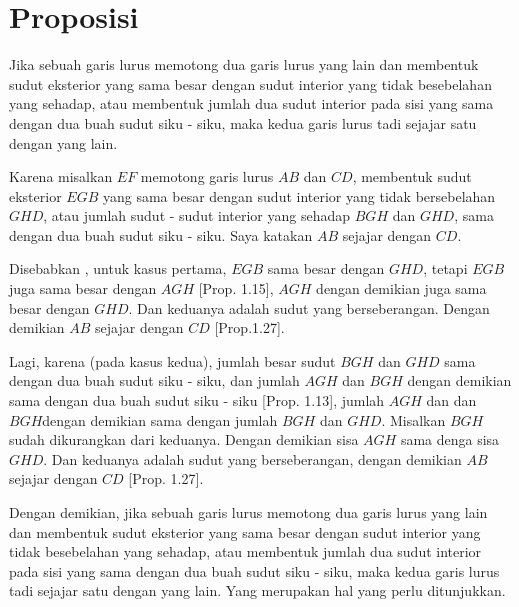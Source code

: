 \documentclass[a4paper]{book}
\begin{document}
\section*{\centering Proposisi \thesection}
Jika sebuah garis lurus memotong dua garis lurus yang lain dan membentuk
sudut eksterior yang sama besar dengan sudut interior yang tidak besebelahan
yang sehadap, atau membentuk jumlah dua sudut interior pada sisi 
yang sama dengan dua buah sudut siku - siku, maka kedua garis lurus
tadi sejajar satu dengan yang lain.
\begin{center}
\end{center} 
Karena misalkan $EF$ memotong garis lurus $AB$ dan $CD$, membentuk sudut 
eksterior $EGB$ yang sama besar dengan sudut interior yang tidak bersebelahan
$GHD$, atau jumlah sudut - sudut interior yang sehadap $BGH$ 
dan $GHD$, sama dengan dua buah sudut siku - siku. Saya katakan $AB$ sejajar 
dengan $CD$.

Disebabkan , untuk kasus pertama, $EGB$ sama besar dengan $GHD$, tetapi $EGB$
juga sama besar dengan $AGH$ [Prop. 1.15], $AGH$ dengan demikian juga sama
besar dengan $GHD$. Dan keduanya adalah sudut yang berseberangan. Dengan
demikian $AB$ sejajar dengan $CD$ [Prop.1.27].

Lagi, karena (pada kasus kedua), jumlah besar sudut $BGH$ dan $GHD$ sama 
dengan dua buah sudut siku - siku, dan jumlah $AGH$ dan $BGH$ dengan demikian
sama dengan dua buah sudut siku - siku  [Prop. 1.13], jumlah $AGH$ dan
dan $BGH$dengan demikian sama dengan jumlah $BGH$ dan $GHD$. Misalkan $BGH$
sudah dikurangkan dari keduanya. Dengan demikian sisa $AGH$ sama denga
sisa $GHD$. Dan keduanya adalah sudut yang berseberangan, dengan demikian
$AB$ sejajar dengan $CD$ [Prop. 1.27].

Dengan demikian, jika sebuah garis lurus memotong dua garis lurus yang lain 
dan membentuk sudut eksterior yang sama besar dengan sudut interior yang tidak 
besebelahan yang sehadap, atau membentuk jumlah dua sudut interior pada sisi 
yang sama dengan dua buah sudut siku - siku, maka kedua garis lurus
tadi sejajar satu dengan yang lain. Yang merupakan hal yang perlu ditunjukkan.
\end{document}
